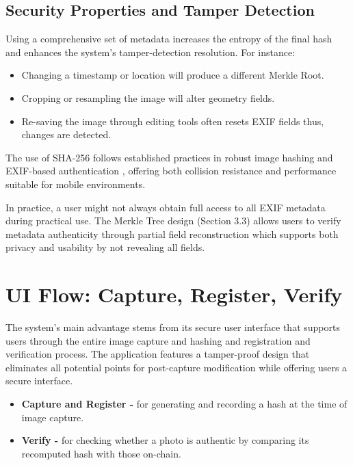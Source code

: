 \subsection{Security Properties and Tamper Detection}
Using a comprehensive set of metadata increases the entropy of the final hash and enhances the system’s tamper-detection resolution. For instance:
\begin{itemize}
    \item Changing a timestamp or location will produce a different Merkle Root.
    \item Cropping or resampling the image will alter geometry fields.
    \item Re-saving the image through editing tools often resets EXIF fields thus, changes are detected.
\end{itemize}

The use of SHA-256 follows established practices in robust image hashing \cite{robustImageHashing} and EXIF-based authentication \cite{authenticationOfDigitalImageExifMetadata}, offering both collision resistance and performance suitable for mobile environments.


In practice, a user might not always obtain full access to all EXIF metadata during practical use. The Merkle Tree design (Section 3.3) allows users to verify metadata authenticity through partial field reconstruction which supports both privacy and usability by not revealing all fields.

\section{UI Flow: Capture, Register, Verify}
The system's main advantage stems from its secure user interface that supports users through the entire image capture and hashing and registration and verification process. The application features a tamper-proof design that eliminates all potential points for post-capture modification while offering users a secure interface.

\begin{itemize}
    \item {\textbf{Capture and Register -}} for generating and recording a hash at the time of image capture.
    \item {\textbf{Verify -}} for checking whether a photo is authentic by comparing its recomputed hash with those on-chain.
\end{itemize}

